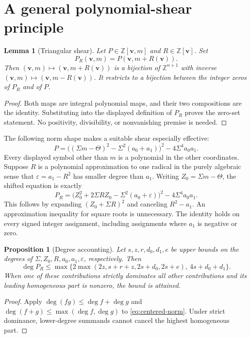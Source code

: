 \documentclass[11pt]{article}
\newtheorem{lemma}[theorem]{Lemma}
\newtheorem{proposition}[theorem]{Proposition}
\theoremstyle{definition}
\theoremstyle{remark}
\newcommand{\Z}{\mathbb Z}
\newcommand{\dd}{\operatorname{deg}}
\begin{document}
\section{A general polynomial-shear principle}

\begin{lemma}[Triangular shear]\label{lem:shear}
Let $P\in\Z[\boldsymbol v,m]$ and $R\in\Z[\boldsymbol v]$. Set
\[
 P_R(\boldsymbol v,m)=P(\boldsymbol v,m+R(\boldsymbol v)).
\]
Then $(\boldsymbol v,m)\mapsto(\boldsymbol v,m+R(\boldsymbol v))$ is a
bijection of $\Z^{n+1}$ with inverse
$(\boldsymbol v,m)\mapsto(\boldsymbol v,m-R(\boldsymbol v))$.
It restricts to a bijection between the integer zeros of $P_R$ and of $P$.
\end{lemma}
\begin{proof}
Both maps are integral polynomial maps, and their two compositions are the
identity. Substituting into the displayed definition of $P_R$ proves the
zero-set statement. No positivity, divisibility, or nonvanishing premise
is needed.
\end{proof}

The following norm shape makes a suitable shear especially effective:
\begin{equation}\label{eq:norm}
 P=\bigl((\Sigma m-\Theta)^2-\Sigma^2(a_0+a_1)\bigr)^2
       -4\Sigma^4a_0a_1.
\end{equation}
Every displayed symbol other than $m$ is a polynomial in the other
coordinates. Suppose $R$ is a polynomial approximation to one radical in
the purely algebraic sense that $\varepsilon=a_1-R^2$ has smaller degree
than $a_1$. Writing $Z_0=\Sigma m-\Theta$, the shifted equation is exactly
\begin{equation}\label{eq:centered-norm}
 P_R=\bigl(Z_0^2+2\Sigma RZ_0-\Sigma^2(a_0+\varepsilon)\bigr)^2
       -4\Sigma^4a_0a_1.
\end{equation}
This follows by expanding $(Z_0+\Sigma R)^2$ and canceling $R^2-a_1$.
An approximation inequality for square roots is unnecessary. The identity
holds on every signed integer assignment, including assignments where
$a_1$ is negative or zero.

\begin{proposition}[Degree accounting]\label{prop:degree}
Let $s,z,r,d_0,d_1,e$ be upper bounds on the degrees of
$\Sigma,Z_0,R,a_0,a_1,\varepsilon$, respectively. Then
\[
 \dd P_R\leq
 \max\{2\max(2z,s+r+z,2s+d_0,2s+e),\ 4s+d_0+d_1\}.
\]
When one of these contributions strictly dominates all other contributions
and its leading homogeneous part is nonzero, the bound is attained.
\end{proposition}
\begin{proof}
Apply $\dd(fg)\leq\dd f+\dd g$ and
$\dd(f+g)\leq\max(\dd f,\dd g)$ to \eqref{eq:centered-norm}.
Under strict dominance, lower-degree summands cannot cancel the highest
homogeneous part.
\end{proof}
\end{document}
